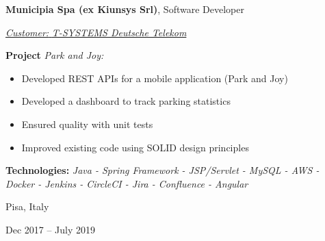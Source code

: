 \documentclass[10pt, a4paper]{article}
\newenvironment{highlights}{
    \begin{itemize}[
        topsep=0.10 cm,
        parsep=0.10 cm,
        partopsep=0pt,
        itemsep=0pt,
        leftmargin=0.4 cm + 10pt
    ]
}{
    \end{itemize}
} %
\newenvironment{twocolentry}[2][]{
    \onecolentry
    \def\secondColumn{#2}
    \setcolumnwidth{\fill, 4.5 cm}
    \begin{paracol}{2}
}{
    \switchcolumn \raggedleft \secondColumn
    \end{paracol}
    \endonecolentry
} %
\begin{document}
        \vspace{0.2 cm}

        \begin{twocolentry}{
            \fontsize{14}{18}Pisa, Italy

        Dec 2017 – July 2019
            \normalsize
        }
            \fontsize{12}{16}
            \textcolor{secondaryColor}{\faBriefcase\hspace{4pt}\textbf{Municipia Spa (ex Kiunsys Srl)},} Software Developer
            \normalsize

            \vspace{0.10 cm}
                \vspace{0.10 cm}

                \textcolor{tertiaryColor}{\faAngleDoubleRight\hspace{0.1cm}\underline{\textit{Customer:} \textit{T-SYSTEMS Deutsche Telekom}}}

                \vspace{0.2cm}
                \textbf{Project \faAngleRight} \textit{Park and Joy:}

                \begin{highlights}
                        \item Developed REST APIs for a mobile application (Park and Joy)
                        \item Developed a dashboard to track parking statistics
                        \item Ensured quality with unit tests
                        \item Improved existing code using SOLID design principles
                \end{highlights}
                \faBuffer
                \textbf{ Technologies:} \textit{Java - Spring Framework - JSP/Servlet - MySQL - AWS - Docker - Jenkins - CircleCI - Jira - Confluence - Angular}

                \vspace{0.10 cm}

        \end{twocolentry}


        \vspace{0.2 cm}
\end{document}
